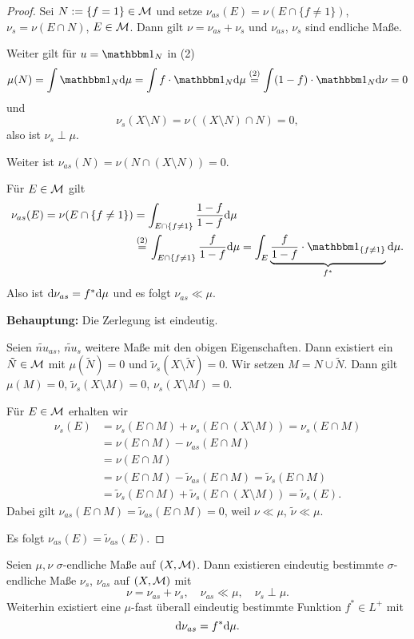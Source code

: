 \documentclass[
 a4paper,
 12pt,
 parskip=half
 ]{scrreprt}
\theoremstyle{plain}
\theoremstyle{definition}
\numberwithin{equation}{section}
\begin{document}
\begin{proof}
  Sei $N := \{f=1\} \in \mathcal{M}$ und setze $\nu_{as}(E) = \nu(E \cap \{f \ne 1 \})$,
  $\nu_s = \nu(E \cap N)$, $E \in \mathcal{M}$. Dann gilt $\nu = \nu_{as} + \nu_s$ und
  $\nu_{as}$, $\nu_s$ sind endliche Maße.

  Weiter gilt für $u = \ind_N$ in (2)
  \[ \mu(N) = \int \ind_N \diffop \mu = \int f \cdot \ind_N \diffop \mu
    \overset{(2)}{=} \int (1-f) \cdot \ind_N \diffop \nu = 0 \]
  und
  \[ \nu_s(X \setminus N) = \nu((X \setminus N) \cap N) = 0, \]
  also ist $\nu_s \perp \mu$.

  Weiter ist $\nu_{as}(N) = \nu(N \cap (X \setminus N)) = 0$.

  Für $E \in \mathcal{M}$ gilt
  \begin{align*}
    \nu_{as}(E) = \nu(E \cap \{ f \ne 1 \} )
    &= \int_{E \cap \{ f \ne 1 \}} \frac{1-f}{1-f} \diffop \mu \\
    &\overset{(2)}{=} \int_{E \cap \{ f \ne 1 \}} \frac{f}{1-f} \diffop \mu
      = \int_E \underbrace{\frac{f}{1-f} \cdot \ind_{\{ f \ne 1 \}}}_{f^*} \diffop \mu.
  \end{align*}
  Also ist $\mathrm{d} \nu_{as} = f^* \mathrm{d} \mu$ und es folgt $\nu_{as} \ll \mu$.

  \textbf{Behauptung:} Die Zerlegung ist eindeutig.

  Seien $\tilde{nu}_{as}$, $\tilde{nu}_s$ weitere Maße mit den obigen
  Eigenschaften. Dann existiert ein $\tilde{N} \in \mathcal{M}$ mit $\mu(\tilde{N}) = 0$
  und $\tilde{\nu}_s(X \setminus \tilde{N}) = 0$. Wir setzen $M = N \cup
  \tilde{N}$. Dann gilt $\mu(M) = 0$, $\tilde{\nu}_{s}(X \setminus M) = 0$,
  $\nu_s(X \setminus M) = 0$.

  Für $E \in \mathcal{M}$ erhalten wir
  \begin{align*}
    \nu_s(E)
    &= \nu_s(E \cap M) + \nu_s(E \cap (X \setminus M)) = \nu_s(E \cap M) \\
    &= \nu(E \cap M) - \nu_{as}(E \cap M) \\
    &= \nu(E \cap M) \\
    &= \nu(E \cap M) - \tilde{\nu}_{as}(E \cap M) = \tilde{\nu}_s(E \cap M) \\
    &= \tilde{\nu}_s(E \cap M) + \tilde{\nu}_s(E \cap (X \setminus M)) = \tilde{\nu}_s(E).
  \end{align*}
  Dabei gilt $\nu_{as}(E \cap M) = \tilde{\nu}_{as}(E \cap M) = 0$, weil $\nu
  \ll \mu$, $\tilde{\nu} \ll \mu$.

  Es folgt $\nu_{as}(E) = \tilde{\nu}_{as}(E)$.
\end{proof}

\begin{thm}
  Seien $\mu, \nu$ $\sigma$-endliche Maße auf $(X,\mathcal{M})$. Dann existieren
  eindeutig bestimmte $\sigma$-endliche Maße $\nu_s$, $\nu_{as}$ auf $(X,\mathcal{M})$
  mit
  \[ \nu = \nu_{as} + \nu_s, \quad \nu_{as} \ll \mu, \quad \nu_s \perp \mu. \]
  Weiterhin existiert eine $\mu$-fast überall eindeutig bestimmte Funktion $f^*
  \in L^+$ mit
  \[ \mathrm{d} \nu_{as} = f^* \mathrm{d} \mu. \]
\end{thm}
\end{document}
